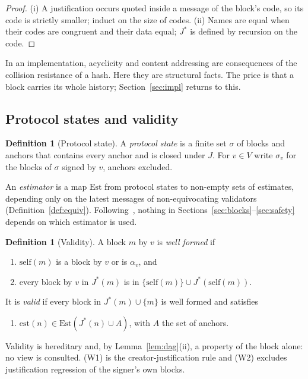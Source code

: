 \documentclass[11pt]{article}
\theoremstyle{definition}
\newtheorem{definition}[theorem]{Definition}
\theoremstyle{remark}
\newcommand{\Jst}{J^{*}}
\newcommand{\slf}{\mathrm{self}}
\newcommand{\est}{\mathrm{est}}
\newcommand{\Est}{\mathrm{Est}}
\begin{document}
\begin{proof}
(i) A justification occurs quoted inside a message of the block's code, so its
code is strictly smaller; induct on the size of codes. (ii) Names are equal
when their codes are congruent and their data equal; $\Jst$ is defined by
recursion on the code.
\end{proof}

In an implementation, acyclicity and content addressing are consequences of
the collision resistance of a hash. Here they are structural facts. The price
is that a block carries its whole history; Section~\ref{sec:impl} returns to
this.

\subsection{Protocol states and validity}

\begin{definition}[Protocol state]
A \emph{protocol state} is a finite set $\sigma$ of blocks and anchors that
contains every anchor and is closed under $J$. For $v\in V$ write
$\sigma_v$ for the blocks of $\sigma$ signed by $v$, anchors excluded.
\end{definition}

An \emph{estimator} is a map $\Est$ from protocol states to non-empty sets of
estimates, depending only on the latest messages of non-equivocating
validators (Definition~\ref{def:equiv}). Following~\cite{cbc}, nothing in
Sections~\ref{sec:blocks}--\ref{sec:safety} depends on which estimator is used.

\begin{definition}[Validity]\label{def:valid}
A block $m$ by $v$ is \emph{well formed} if
\begin{enumerate}[label=(W\arabic*)]
\item $\slf(m)$ is a block by $v$ or is $\alpha_v$, and
\item every block by $v$ in $\Jst(m)$ is in $\{\slf(m)\}\cup\Jst(\slf(m))$.
\end{enumerate}
It is \emph{valid} if every block in $\Jst(m)\cup\{m\}$ is well formed and
satisfies
\begin{enumerate}[label=(V)]
\item $\est(n)\in\Est(\Jst(n)\cup A)$, with $A$ the set of anchors.
\end{enumerate}
\end{definition}

Validity is hereditary and, by Lemma~\ref{lem:dag}(ii), a property of the block
alone: no view is consulted. (W1) is the creator-justification rule and (W2)
excludes justification regression of the signer's own blocks.
\end{document}
